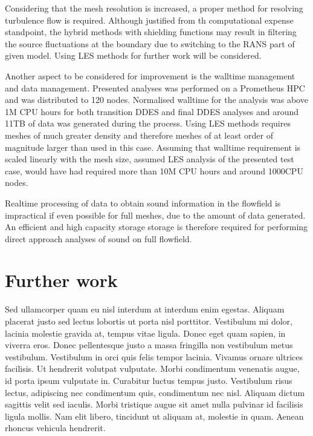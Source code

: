 Considering that the mesh resolution is increased, a proper method for resolving turbulence flow is required. Although justified from th computational expense standpoint, the hybrid methods with shielding functions may result in filtering the source fluctuations at the boundary due to switching to the RANS part of given model. Using LES methods for further work will be considered.

Another aspect to be considered for improvement is the walltime management and data management. Presented analyses was performed on a Prometheus HPC and was distributed to 120 nodes. Normalised walltime for the analysis was above 1M CPU hours for both transition DDES and final DDES analyses and around 11TB of data was generated during the process. Using LES methods requires meshes of much greater density and therefore meshes of at least order of magnitude larger than used in this case. Assuming that walltime requirement is scaled linearly with the mesh size, assumed LES analysis of the presented test case, would have had required more than 10M CPU hours and around 1000CPU nodes.

Realtime processing of data to obtain sound information in the flowfield is impractical if even possible for full meshes, due to the amount of data generated. An efficient and high capacity storage storage is therefore required for performing direct approach analyses of sound on full flowfield. 

\section{Further work}
Sed ullamcorper quam eu nisl interdum at interdum enim egestas. Aliquam placerat justo sed lectus lobortis ut porta nisl porttitor. Vestibulum mi dolor, lacinia molestie gravida at, tempus vitae ligula. Donec eget quam sapien, in viverra eros. Donec pellentesque justo a massa fringilla non vestibulum metus vestibulum. Vestibulum in orci quis felis tempor lacinia. Vivamus ornare ultrices facilisis. Ut hendrerit volutpat vulputate. Morbi condimentum venenatis augue, id porta ipsum vulputate in. Curabitur luctus tempus justo. Vestibulum risus lectus, adipiscing nec condimentum quis, condimentum nec nisl. Aliquam dictum sagittis velit sed iaculis. Morbi tristique augue sit amet nulla pulvinar id facilisis ligula mollis. Nam elit libero, tincidunt ut aliquam at, molestie in quam. Aenean rhoncus vehicula hendrerit.

